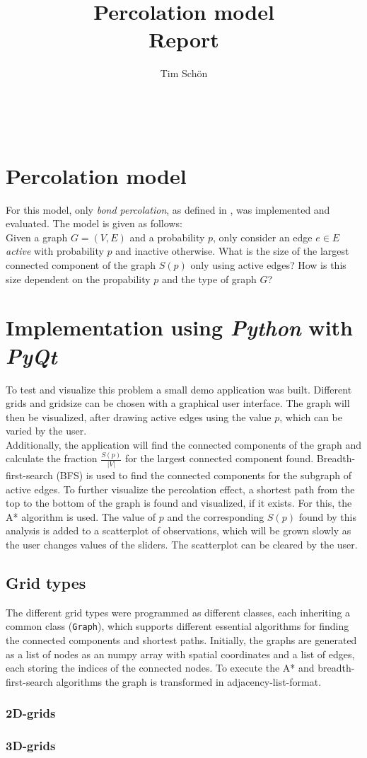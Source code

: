 \documentclass[a4paper,fleqn]{article}
\begin{document}
\title{Percolation model\\ \Large{Report}}
\author{Tim Schön}
\date{}
\maketitle
\ \\

\section*{Percolation model}
For this model, only \emph{bond percolation}, as defined in \cite{Percolation}, was implemented and evaluated. The model is given as follows:\\
Given a graph $G = (V,E)$ and a probability $p$, only consider an edge $e \in E$ \emph{active} with probability $p$ and inactive otherwise. 
What is the size of the largest connected component of the graph $S(p)$ only using active edges? 
How is this size dependent on the propability $p$ and the type of graph $G$?

\section*{Implementation using \emph{Python} with \emph{PyQt}}
To test and visualize this problem a small demo application was built. Different grids and gridsize can be chosen with a graphical 
user interface. The graph will then be visualized, after drawing active edges using the value $p$, which can be varied by the user.\\
Additionally, the application will find the connected components of the graph and calculate the fraction $\frac{S(p)}{|V|}$ for the largest connected component found. Breadth-first-search (BFS) is used to find the connected components for the subgraph of active edges.
To further visualize the percolation effect, a shortest path from the top to the bottom of the graph is found and visualized, if it exists. For this, the A* algorithm is used.
The value of $p$ and the corresponding $S(p)$ found by this analysis is added to a scatterplot of observations, which will be grown slowly as the user changes values of the sliders. 
The scatterplot can be cleared by the user.\\
\subsection*{Grid types}
The different grid types were programmed as different classes, each inheriting a common class (\verb|Graph|), which supports different essential algorithms for finding the connected 
components and shortest paths. Initially, the graphs are generated as a list of nodes as an numpy array with spatial coordinates and a list of edges, each storing the indices of the connected nodes.
To execute the A* and breadth-first-search algorithms the graph is transformed in adjacency-list-format.
\subsubsection*{2D-grids}
\subsubsection*{3D-grids}

\end{document}
